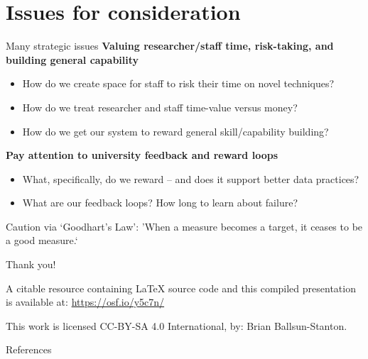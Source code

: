 \documentclass[aspectratio=169, 11pt]{beamer} %
\begin{document}
\section{Issues for consideration}
\begin{frame}{Many strategic issues}
\textbf{Valuing researcher/staff time,  risk-taking, and building general capability}
\begin{itemize}
    \item How do we create space for staff to risk their time on novel techniques?
    \item How do we treat researcher and staff time-value versus money?
    \item How do we get our system to reward general skill/capability building?
\end{itemize}
    
\textbf{Pay attention to university feedback and reward loops}    
    \begin{itemize}
    \item What, specifically, do we reward -- and does it support better data practices?
    \item What are our feedback loops? How long to learn about failure?
\end{itemize}


Caution via `Goodhart's Law': 'When a measure becomes a target, it ceases to be a good measure.` \parencite{Strathern1997-du, Goodhart1975-cq}

\end{frame}



\begin{frame}{Thank you!}


A citable resource containing \LaTeX{} source code and this compiled presentation is available at: \url{https://osf.io/y5c7n/}

This work is licensed CC-BY-SA 4.0 International, by: Brian Ballsun-Stanton. 

\end{frame}



\begin{frame}{References}
\printbibliography[heading=none]
\end{frame}
\end{document}
